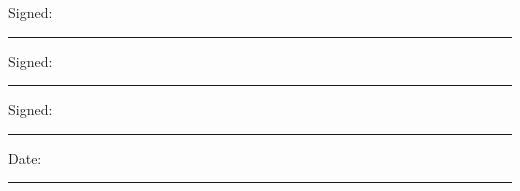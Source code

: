 \documentclass[a4paper, 11pt, oneside]{Thesis}  %
\begin{document}
 
Signed:\\
\rule[1em]{25em}{0.5pt}  %

Signed:\\
\rule[1em]{25em}{0.5pt}  %

Signed:\\
\rule[1em]{25em}{0.5pt}  %
 
Date:\\
\rule[1em]{25em}{0.5pt}  %
\clearpage  %






%
%
%
\end{document}
